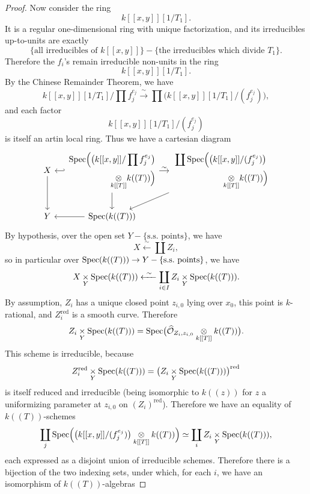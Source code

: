 \begin{proof}
Now consider the ring
\[
k[[x, y]][1/T_1] .
\]
It is a regular one-dimensional ring with unique factorization, and its irreducibles up-to-units are exactly
\[
\{\text{all irreducibles of } k[[x, y]]\} - \{\text{the irreducibles which divide } T_1\} .
\]
Therefore the $f_i$'s remain irreducible non-units in the ring
\[
k[[x, y]][1/T_1] .
\]
By the Chinese Remainder Theorem, we have
\[
k[[x, y]][1/T_1]\Big/\prod f_j^{e_j} \xrightarrow{\ \sim\ } \prod \bigl(k[[x, y]][1/T_1]/(f_j^{e_j})\bigr) ,
\]
and each factor
\[
k[[x, y]][1/T_1]/(f_j^{e_j})
\]
is itself an artin local ring. Thus we have a cartesian diagram
\[
\begin{tikzcd}[row sep=2em, column sep=small]
X \arrow[d] &
\begin{gathered}
\Spec\Bigl( \bigl(k[[x, y]]/\prod f_j^{e_j}\bigr) \\
\qquad\qquad\quad \tens{k[[T]]} k((T)) \Bigr)
\end{gathered}
  \arrow[l, hook'] \arrow[d] \arrow[r, "\sim"] &
\begin{gathered}
\coprod \Spec\Bigl( \bigl(k[[x, y]]/(f_j^{e_j})\bigr) \\
\qquad\qquad\qquad \tens{k[[T]]} k((T)) \Bigr)
\end{gathered}
  \arrow[ld] \\
Y & \Spec(k((T))) \arrow[l] &
\end{tikzcd}
\]
By hypothesis, over the open set $Y - \{\text{s.s.\ points}\}$, we have
\[
X \xleftarrow{\ \sim\ } \coprod Z_i ,
\]
so in particular over $\operatorname{Spec}(k((T))) \to Y - \{\text{s.s.\ points}\}$, we have
\[
X \underset{Y}{\times} \operatorname{Spec}(k((T))) \xleftarrow{\ \sim\ } \coprod_{i \in I} Z_i \underset{Y}{\times} \operatorname{Spec}(k((T))) .
\]
By assumption, $Z_i$ has a unique closed point $z_{i,0}$ lying over $x_0$, this point is $k$-rational, and $Z_i^{\mathrm{red}}$ is a smooth curve. Therefore
\[
Z_i \underset{Y}{\times} \operatorname{Spec}(k((T))) = \operatorname{Spec}\bigl( \widehat{\mathcal{O}}_{Z_i, z_{i,0}} \underset{k[[T]]}{\otimes} k((T)) \bigr) .
\]
This scheme is irreducible, because
\[
Z_i^{\mathrm{red}} \underset{Y}{\times} \operatorname{Spec}(k((T))) = \bigl( Z_i \underset{Y}{\times} \operatorname{Spec}(k((T))) \bigr)^{\mathrm{red}}
\]
is itself reduced and irreducible (being isomorphic to $k((z))$ for $z$ a uniformizing parameter at $z_{i,0}$ on $(Z_i)^{\mathrm{red}}$). Therefore we have an equality of $k((T))$-schemes
\[
\coprod_j \operatorname{Spec}\Bigl( \bigl(k[[x, y]]/(f_j^{e_j})\bigr) \underset{k[[T]]}{\otimes} k((T)) \Bigr) \simeq \coprod_i Z_i \underset{Y}{\times} \operatorname{Spec}(k((T))) ,
\]
each expressed as a disjoint union of irreducible schemes. Therefore there is a bijection of the two indexing sets, under which, for each $i$, we have an isomorphism of $k((T))$-algebras

\end{proof}
